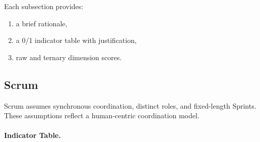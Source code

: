 \documentclass[11pt, a4paper, twocolumn]{article} %
\begin{document}
Each subsection provides:

\begin{enumerate}[label=(\roman*)]
    \item a brief rationale,
    \item a 0/1 indicator table with justification,
    \item raw and ternary dimension scores.
\end{enumerate}

\subsection*{Scrum}

Scrum \citep{schwaber2017scrum} assumes synchronous coordination, distinct roles,
and fixed-length Sprints. These assumptions reflect a human-centric
coordination model.

\paragraph{Indicator Table.}
\end{document}
